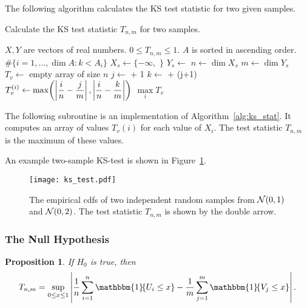 \documentclass[letterpaper, reqno]{amsart}
\newtheorem{prop}{Proposition}[section]
\numberwithin{equation}{section}
\newcommand{\N}[2]{\mathcal{N}\mleft( #1, #2 \mright)}
\newcommand{\indic}[1]{\mathbbm{1}\!\mleft\{#1\mright\}} %
\newcommand{\sumi}[2]{\sum_{#1=1}^{#2}}
\newcommand{\avg}[2]{\frac{1}{#2}\sumi{#1}{#2}}
\begin{document}
\clearpage
The following algorithm calculates the KS test statistic for two given samples.
\begin{algorithm}[!h]
  \caption{Calculate the KS test statistic $T_{n,m}$ for two samples.}
  \label{alg:ks_stat}
  \begin{algorithmic}[1]
    \Require $X, Y$ are vectors of real numbers.
    \Ensure $0 \le T_{n,m} \le 1$.
       $A$ is sorted in ascending order.
      \State\Return $\#\{i=1,\dots,\dim A \colon k < A_i\}$
    \EndFunction
    \State $X_s \gets \{-\infty,$ $\}$
    \State $Y_s \gets$ 
    \State $n \gets \dim X_s$
    \State $m \gets \dim Y_s$
    \State $T_v \gets$ empty array of size $n$
      \State $j \gets$  + 1
      \State $k \gets$ 
      + (j+1)
      \State $\displaystyle{T_v^{(i)} \gets 
        \max\mleft(\left|\frac{i}{n} - \frac{j}{m}\right|,
              \left|\frac{i}{n} - \frac{k}{m}\right|\mright)}$
    \EndFor
    \State\Return $\max\limits_i T_v$
    \EndProcedure
  \end{algorithmic}
\end{algorithm}

\clearpage
The following subroutine is an implementation of Algorithm~\ref{alg:ks_stat}. It computes an array of values $T_v(i)$ for each value of $X_i$. The test statistic $T_{n,m}$ is the maximum of these values.


\clearpage
An example two-sample KS-test is shown in Figure~\ref{fig:ks_test}.
\begin{figure}[!h]
  \centering
  \texttt{[image: ks\_test.pdf]}
  \caption{The empirical cdfs of two independent random samples from $\N{0}{1}$ and $\N{0}{2}$. The test statistic $T_{n,m}$ is shown by the double arrow.}
  \label{fig:ks_test}
\end{figure}

\subsubsection{The Null Hypothesis}
\begin{prop}
  If $H_0$ is true, then
  \[ T_{n,m} = \sup_{0 \le x \le 1} \left| \avg{i}{n} \indic{U_i \le x}
- \avg{j}{m} \indic{V_j \le x} \right|. \]
\end{prop}
\end{document}
